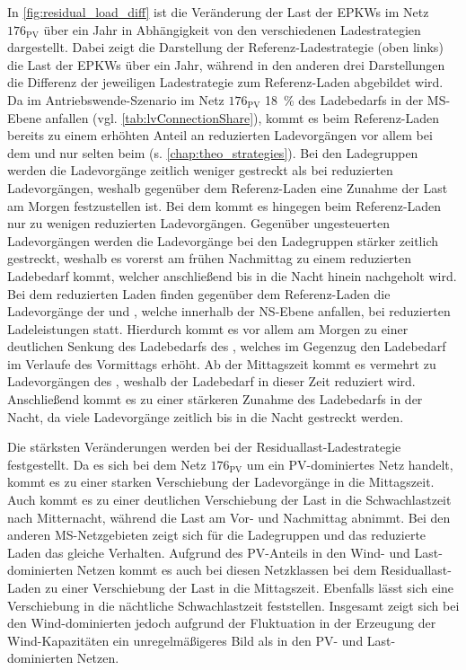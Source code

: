

In \autoref{fig:residual_load_diff} ist die Veränderung der Last der \glspl{EPKW} im Netz \(176_{\text{PV}}\) über ein Jahr in Abhängigkeit von den verschiedenen Ladestrategien dargestellt.
Dabei zeigt die Darstellung der Referenz-Ladestrategie (oben links) die Last der \glspl{EPKW} über ein Jahr, während in den anderen drei Darstellungen die Differenz der jeweiligen Ladestrategie zum Referenz-Laden abgebildet wird.
Da im Antriebswende-Szenario im Netz \(176_{\text{PV}}\) \SI{18}{\percent} des Ladebedarfs in der \gls{MS}-Ebene anfallen (vgl. \autoref{tab:lvConnectionShare}), kommt es beim Referenz-Laden bereits zu einem erhöhten Anteil an reduzierten Ladevorgängen vor allem bei dem \UC \Firmeparkplatz und nur selten beim \UC \zH (s. \autoref{chap:theo_strategies}).
Bei den Ladegruppen werden die Ladevorgänge zeitlich weniger gestreckt als bei reduzierten Ladevorgängen, weshalb gegenüber dem Referenz-Laden eine Zunahme der Last am Morgen festzustellen ist.
Bei dem \UC \zH kommt es hingegen beim Referenz-Laden nur zu wenigen reduzierten Ladevorgängen.
Gegenüber ungesteuerten Ladevorgängen werden die Ladevorgänge bei den Ladegruppen stärker zeitlich gestreckt, weshalb es vorerst am frühen Nachmittag zu einem reduzierten Ladebedarf kommt, welcher anschließend bis in die Nacht hinein nachgeholt wird.
Bei dem reduzierten Laden finden gegenüber dem Referenz-Laden die Ladevorgänge der \UCs \zH und \Firmeparkplatzdot, welche innerhalb der \gls{NS}-Ebene anfallen, bei reduzierten Ladeleistungen statt.
Hierdurch kommt es vor allem am Morgen zu einer deutlichen Senkung des Ladebedarfs des \UC \Firmeparkplatzdot, welches im Gegenzug den Ladebedarf im Verlaufe des Vormittags erhöht.
Ab der Mittagszeit kommt es vermehrt zu Ladevorgängen des \UC \zHdot, weshalb der Ladebedarf in dieser Zeit reduziert wird.
Anschließend kommt es zu einer stärkeren Zunahme des Ladebedarfs in der Nacht, da viele Ladevorgänge zeitlich bis in die Nacht gestreckt werden.



Die stärksten Veränderungen werden bei der Residuallast-Ladestrategie festgestellt.
Da es sich bei dem Netz \(176_{\text{PV}}\) um ein \gls{PV}-dominiertes Netz handelt, kommt es zu einer starken Verschiebung der Ladevorgänge in die Mittagszeit.
Auch kommt es zu einer deutlichen Verschiebung der Last in die Schwachlastzeit nach Mitternacht, während die Last am Vor- und Nachmittag abnimmt.
Bei den anderen \gls{MS}-Netzgebieten zeigt sich für die Ladegruppen und das reduzierte Laden das gleiche Verhalten.
Aufgrund des \gls{PV}-Anteils in den Wind- und Last-dominierten Netzen kommt es auch bei diesen Netzklassen bei dem Residuallast-Laden zu einer Verschiebung der Last in die Mittagszeit.
Ebenfalls lässt sich eine Verschiebung in die nächtliche Schwachlastzeit feststellen.
Insgesamt zeigt sich bei den Wind-dominierten jedoch aufgrund der Fluktuation in der Erzeugung der Wind-Kapazitäten ein unregelmäßigeres Bild als in den \gls{PV}- und Last-dominierten Netzen.


